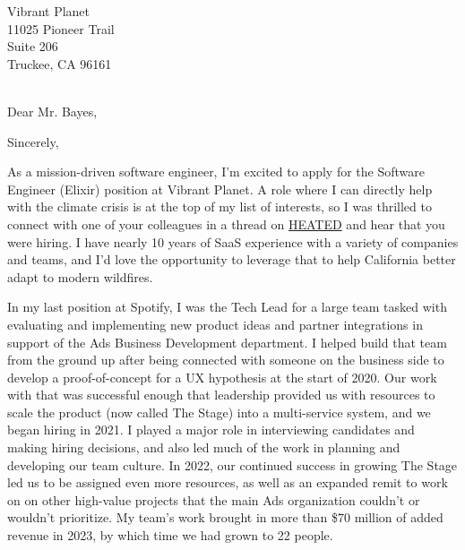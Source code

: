 

	{Vibrant Planet
	\\11025 Pioneer Trail
    \\Suite 206
	\\Truckee, CA 96161}

\date{February 21, 2024}
\opening{\\Dear Mr. Bayes,}
\closing{Sincerely,}
\makelettertitle


As a mission-driven software engineer, I'm excited to apply for the Software Engineer (Elixir) position at Vibrant Planet.
A role where I can directly help with the climate crisis is at the top of my list of interests,
so I was thrilled to connect with one of your colleagues in a thread on
\textcolor{color1}{\href{https://heated.world/}{HEATED}} and hear that you were hiring.
I have nearly 10 years of SaaS experience with a variety of companies and teams,
and I'd love the opportunity to leverage that to help California better adapt to modern wildfires.

In my last position at Spotify, I was the Tech Lead for a large team tasked with evaluating and implementing new product ideas
and partner integrations in support of the Ads Business Development department.
I helped build that team from the ground up after being connected with someone on the business side to develop a proof-of-concept
for a UX hypothesis at the start of 2020. Our work with that was successful enough that leadership provided us with resources
to scale the product (now called The Stage) into a multi-service system, and we began hiring in 2021.
I played a major role in interviewing candidates and making hiring decisions,
and also led much of the work in planning and developing our team culture.
In 2022, our continued success in growing The Stage led us to be assigned even more resources,
as well as an expanded remit to work on on other high-value projects that the main Ads organization couldn't or wouldn't prioritize.
My team's work brought in more than \$70 million of added revenue in 2023, by which time we had grown to 22 people.

